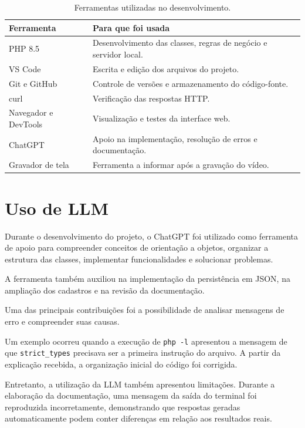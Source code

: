 \documentclass[12pt,a4paper]{article}
\begin{document}
\begin{table}[H]
\centering
\small
\begin{tabularx}{\linewidth}{@{}lX@{}}
\toprule
\textbf{Ferramenta} & \textbf{Para que foi usada} \\
\midrule
PHP 8.5 & Desenvolvimento das classes, regras de negócio e servidor local. \\
VS Code & Escrita e edição dos arquivos do projeto. \\
Git e GitHub & Controle de versões e armazenamento do código-fonte. \\
curl & Verificação das respostas HTTP. \\
Navegador e DevTools & Visualização e testes da interface web. \\
ChatGPT & Apoio na implementação, resolução de erros e documentação. \\
Gravador de tela & Ferramenta a informar após a gravação do vídeo. \\
\bottomrule
\end{tabularx}
\caption{Ferramentas utilizadas no desenvolvimento.}
\end{table}

\section{Uso de LLM}

Durante o desenvolvimento do projeto, o ChatGPT foi utilizado como ferramenta de apoio para compreender conceitos de orientação a objetos, organizar a estrutura das classes, implementar funcionalidades e solucionar problemas.

A ferramenta também auxiliou na implementação da persistência em JSON, na ampliação dos cadastros e na revisão da documentação.

Uma das principais contribuições foi a possibilidade de analisar mensagens de erro e compreender suas causas.

Um exemplo ocorreu quando a execução de \texttt{php -l} apresentou a mensagem de que \texttt{strict\_types} precisava ser a primeira instrução do arquivo. A partir da explicação recebida, a organização inicial do código foi corrigida.

Entretanto, a utilização da LLM também apresentou limitações. Durante a elaboração da documentação, uma mensagem da saída do terminal foi reproduzida incorretamente, demonstrando que respostas geradas automaticamente podem conter diferenças em relação aos resultados reais.
\end{document}
